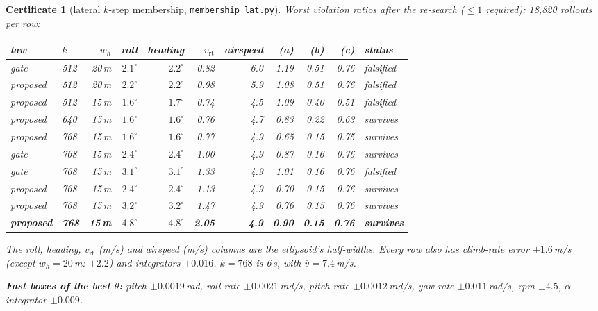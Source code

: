 \documentclass[11pt]{article}
\newtheorem{cert}{Certificate}
\begin{document}
\begin{cert}[lateral $k$-step membership, \texttt{membership\_lat.py}]\label{cert:lateral}
Worst violation ratios after the re-search ($\le 1$ required); 18{,}820 rollouts per row:

\begin{center}
\small
\begin{tabular}{llrrrrrrrrl}
\toprule
law & $k$ & $w_h$ & roll & heading & $v_{\mathrm{rt}}$ & airspeed & (a) & (b) & (c) & status\\
\midrule
gate & 512 & 20\,m & $2.1^\circ$ & $2.2^\circ$ & 0.82 & 6.0 & 1.19 & 0.51 & 0.76 & falsified\\
proposed & 512 & 20\,m & $2.2^\circ$ & $2.2^\circ$ & 0.98 & 5.9 & 1.08 & 0.51 & 0.76 & falsified\\
proposed & 512 & 15\,m & $1.6^\circ$ & $1.7^\circ$ & 0.74 & 4.5 & 1.09 & 0.40 & 0.51 & falsified\\
proposed & 640 & 15\,m & $1.6^\circ$ & $1.6^\circ$ & 0.76 & 4.7 & 0.83 & 0.22 & 0.63 & survives\\
proposed & 768 & 15\,m & $1.6^\circ$ & $1.6^\circ$ & 0.77 & 4.9 & 0.65 & 0.15 & 0.75 & survives\\
gate & 768 & 15\,m & $2.4^\circ$ & $2.4^\circ$ & 1.00 & 4.9 & 0.87 & 0.16 & 0.76 & survives\\
gate & 768 & 15\,m & $3.1^\circ$ & $3.1^\circ$ & 1.33 & 4.9 & 1.01 & 0.16 & 0.76 & falsified\\
proposed & 768 & 15\,m & $2.4^\circ$ & $2.4^\circ$ & 1.13 & 4.9 & 0.70 & 0.15 & 0.76 & survives\\
proposed & 768 & 15\,m & $3.2^\circ$ & $3.2^\circ$ & 1.47 & 4.9 & 0.76 & 0.15 & 0.76 & survives\\
\textbf{proposed} & \textbf{768} & \textbf{15\,m} & $\mathbf{4.8^\circ}$ & $\mathbf{4.8^\circ}$ & \textbf{2.05} & \textbf{4.9} & \textbf{0.90} & \textbf{0.15} & \textbf{0.76} & \textbf{survives}\\
\bottomrule
\end{tabular}
\end{center}

The roll, heading, $v_{\mathrm{rt}}$ (m/s) and airspeed (m/s) columns are the ellipsoid's half-widths. Every row also has climb-rate error $\pm1.6$\,m/s (except $w_h = 20$\,m: $\pm2.2$) and integrators $\pm0.016$. $k = 768$ is 6\,s, with $\bar v = 7.4$\,m/s.

\textbf{Fast boxes of the best $\theta$:} pitch $\pm0.0019$\,rad, roll rate $\pm0.0021$\,rad/s, pitch rate $\pm0.0012$\,rad/s, yaw rate $\pm0.011$\,rad/s, rpm $\pm4.5$, $\alpha$ integrator $\pm0.009$.
\end{cert}
\end{document}
